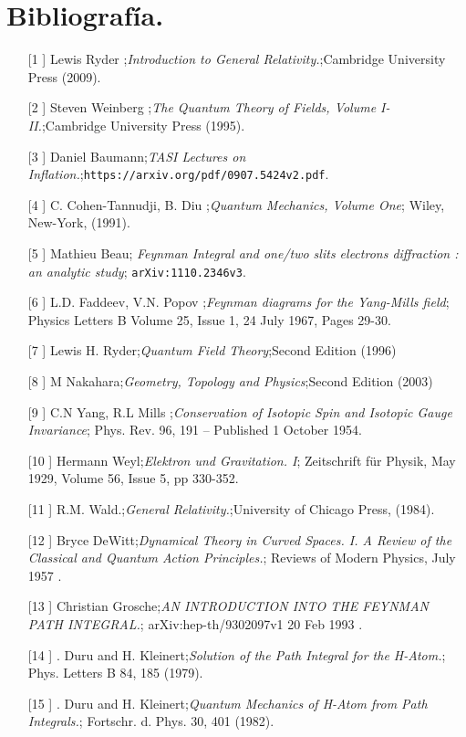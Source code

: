 \chapter{Bibliografía.}
\begin{itemize}
\item[[1]] Lewis Ryder ;\textit{Introduction to General Relativity.};Cambridge University Press (2009).
\item[[2]] Steven Weinberg ;\textit{The Quantum Theory of Fields, Volume I-II.};Cambridge University Press (1995).
\item[[3]] Daniel Baumann;\textit{TASI Lectures on Inflation.};\texttt{https://arxiv.org/pdf/0907.5424v2.pdf}.
\item[[4]] C. Cohen-Tannudji, B. Diu ;\textit{Quantum Mechanics, Volume One}; Wiley, New-York, (1991).
\item[[5]] Mathieu Beau; \textit{Feynman Integral and one/two slits electrons diffraction : an analytic study}; \texttt{arXiv:1110.2346v3}.
\item[[6]]  L.D. Faddeev,  V.N. Popov ;\textit{Feynman diagrams for the Yang-Mills field}; Physics Letters B Volume 25, Issue 1, 24 July 1967, Pages 29-30.
\item[[7]] Lewis H. Ryder;\textit{Quantum Field Theory};Second Edition (1996) 
\item[[8]] M Nakahara;\textit{Geometry, Topology and Physics};Second Edition (2003) 
\item[[9]]  C.N Yang,  R.L Mills ;\textit{Conservation of Isotopic Spin and Isotopic Gauge Invariance}; Phys. Rev. 96, 191 – Published 1 October 1954.
\item[[10]]  Hermann Weyl;\textit{Elektron und Gravitation. I}; Zeitschrift für Physik, May 1929, Volume 56, Issue 5, pp 330-352.
\item[[11]] R.M. Wald.;\textit{General Relativity.};University of Chicago Press, (1984). 
\item[[12]]  Bryce DeWitt;\textit{Dynamical Theory in Curved Spaces. I. A Review of the Classical and Quantum Action Principles.}; Reviews of Modern Physics, July 1957 .
\item[[13]]  Christian Grosche;\textit{AN INTRODUCTION INTO
THE FEYNMAN PATH INTEGRAL.}; arXiv:hep-th/9302097v1 20 Feb 1993 .
\item[[14]]  . Duru and H. Kleinert;\textit{Solution of the Path Integral for the H-Atom.}; Phys. Letters B 84, 185 (1979).
\item[[15]]  . Duru and H. Kleinert;\textit{Quantum Mechanics of H-Atom from Path Integrals.};  Fortschr. d. Phys. 30, 401 (1982).

\end{itemize}
